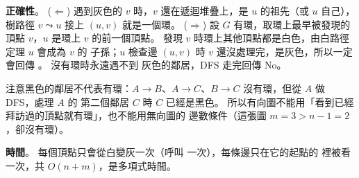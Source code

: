 \begin{pastsoln}
\textbf{正確性}。 ($\Leftarrow$) 遇到灰色的 $v$ 時，$v$ 還在遞迴堆疊上，是 $u$ 的祖先（或 $u$ 自己），
樹路徑 $v \leadsto u$ 接上 $(u, v)$ 就是一個環。 ($\Rightarrow$) 設 $G$ 有環，取環上最早被發現的頂點
$v$，$u$ 是環上 $v$ 的前一個頂點。 發現 $v$ 時環上其他頂點都是白色，由白路徑定理 $u$ 會成為 $v$ 的
子孫；$u$ 檢查邊 $(u, v)$ 時 $v$ 還沒處理完，是灰色，所以一定會回傳 \TRUE。 沒有環時永遠遇不到
灰色的鄰居，DFS 走完回傳 No。

注意黑色的鄰居不代表有環：$A \to B$、$A \to C$、$B \to C$ 沒有環，但從 $A$ 做 DFS，處理 $A$ 的
第二個鄰居 $C$ 時 $C$ 已經是黑色。 所以有向圖不能用「看到已經拜訪過的頂點就有環」，也不能用無向圖的
邊數條件（這張圖 $m = 3 > n - 1 = 2$，卻沒有環）。

\textbf{時間}。 每個頂點只會從白變灰一次（呼叫  一次），每條邊只在它的起點的
 裡被看一次，共 $O(n + m)$，是多項式時間。
\end{pastsoln}
